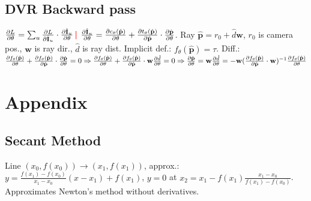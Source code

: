 \documentclass[11pt,landscape,a4paper,fleqn]{article}
\newcommand{\sep}{\,\textcolor{red}{\bm|}\,}
\def\myvector#1{\mathbf{#1}}
\def\vp{{\myvector{p}}}
\def\vw{{\myvector{w}}}
\def\mymatrix#1{\mathbf{#1}}
\def\mI{{\mymatrix{I}}}
\begin{document}
\begin{multicols*}{3}
\subsection*{DVR Backward pass}
$\pdv{L}{\theta} = \sum_u \pdv{L}{\hat\mI_u} \cdot \pdv{\hat\mI_u}{\theta} \sep\!$
$\pdv{\hat\mI_u}{\theta} = \pdv{c_\theta(\hat\vp)}{\theta} + \pdv{t_\theta(\hat\vp)}{\hat\vp}
 \cdot \pdv{\hat\vp}{\theta}$.
Ray $\hat\vp = r_0 + \hat{d}\vw$,
$r_0$ is camera pos., $\vw$ is ray dir., $\hat{d}$ is ray dist.
Implicit def.: $f_\theta(\hat\vp) = \tau$.
Diff.:
$\pdv{f_\theta(\hat\vp)}{\theta} + \pdv{f_\theta(\hat\vp)}{\hat\vp} \cdot \pdv{\hat\vp}{\theta} = 0 \Rightarrow
\pdv{f_\theta(\hat\vp)}{\theta} + \pdv{f_\theta(\hat\vp)}{\hat\vp} \cdot \vw\pdv{\hat{d}}{\theta} = 0 \Rightarrow 
\pdv{\hat\vp}{\theta} = \vw \pdv{\hat{d}}{\theta} = - \vw(\pdv{f_\theta(\hat{\vp})}{\hat{\vp}} \cdot \vw)^{-1}
\pdv{f_\theta(\hat\vp)}{\theta}$

\section{Appendix}

\subsection*{Secant Method}

Line $(x_0, f(x_0)) \to (x_1, f(x_1))$, approx.:
$y = \frac{f(x_1) - f(x_0)}{x_1 - x_0}(x - x_1) + f(x_1)$,
$y = 0$ at $x_2 = x_1 - f(x_1) \frac{x_1 - x_0}{f(x_1) - f(x_0)}$.
Approximates Newton's method without derivatives.

\end{multicols*}
\end{document}
